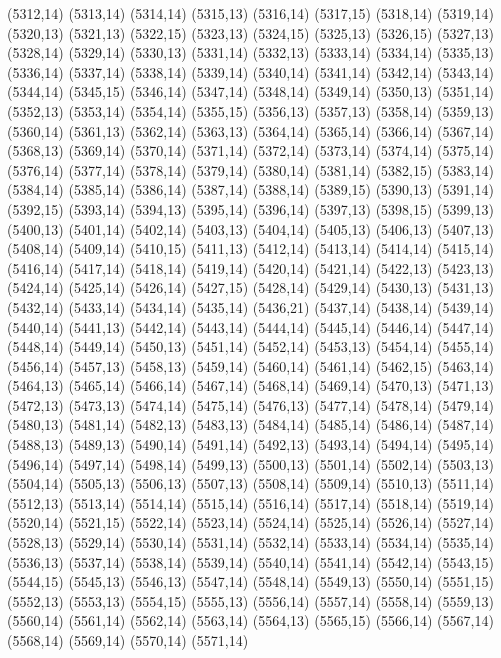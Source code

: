 (5312,14)
(5313,14)
(5314,14)
(5315,13)
(5316,14)
(5317,15)
(5318,14)
(5319,14)
(5320,13)
(5321,13)
(5322,15)
(5323,13)
(5324,15)
(5325,13)
(5326,15)
(5327,13)
(5328,14)
(5329,14)
(5330,13)
(5331,14)
(5332,13)
(5333,14)
(5334,14)
(5335,13)
(5336,14)
(5337,14)
(5338,14)
(5339,14)
(5340,14)
(5341,14)
(5342,14)
(5343,14)
(5344,14)
(5345,15)
(5346,14)
(5347,14)
(5348,14)
(5349,14)
(5350,13)
(5351,14)
(5352,13)
(5353,14)
(5354,14)
(5355,15)
(5356,13)
(5357,13)
(5358,14)
(5359,13)
(5360,14)
(5361,13)
(5362,14)
(5363,13)
(5364,14)
(5365,14)
(5366,14)
(5367,14)
(5368,13)
(5369,14)
(5370,14)
(5371,14)
(5372,14)
(5373,14)
(5374,14)
(5375,14)
(5376,14)
(5377,14)
(5378,14)
(5379,14)
(5380,14)
(5381,14)
(5382,15)
(5383,14)
(5384,14)
(5385,14)
(5386,14)
(5387,14)
(5388,14)
(5389,15)
(5390,13)
(5391,14)
(5392,15)
(5393,14)
(5394,13)
(5395,14)
(5396,14)
(5397,13)
(5398,15)
(5399,13)
(5400,13)
(5401,14)
(5402,14)
(5403,13)
(5404,14)
(5405,13)
(5406,13)
(5407,13)
(5408,14)
(5409,14)
(5410,15)
(5411,13)
(5412,14)
(5413,14)
(5414,14)
(5415,14)
(5416,14)
(5417,14)
(5418,14)
(5419,14)
(5420,14)
(5421,14)
(5422,13)
(5423,13)
(5424,14)
(5425,14)
(5426,14)
(5427,15)
(5428,14)
(5429,14)
(5430,13)
(5431,13)
(5432,14)
(5433,14)
(5434,14)
(5435,14)
(5436,21)
(5437,14)
(5438,14)
(5439,14)
(5440,14)
(5441,13)
(5442,14)
(5443,14)
(5444,14)
(5445,14)
(5446,14)
(5447,14)
(5448,14)
(5449,14)
(5450,13)
(5451,14)
(5452,14)
(5453,13)
(5454,14)
(5455,14)
(5456,14)
(5457,13)
(5458,13)
(5459,14)
(5460,14)
(5461,14)
(5462,15)
(5463,14)
(5464,13)
(5465,14)
(5466,14)
(5467,14)
(5468,14)
(5469,14)
(5470,13)
(5471,13)
(5472,13)
(5473,13)
(5474,14)
(5475,14)
(5476,13)
(5477,14)
(5478,14)
(5479,14)
(5480,13)
(5481,14)
(5482,13)
(5483,13)
(5484,14)
(5485,14)
(5486,14)
(5487,14)
(5488,13)
(5489,13)
(5490,14)
(5491,14)
(5492,13)
(5493,14)
(5494,14)
(5495,14)
(5496,14)
(5497,14)
(5498,14)
(5499,13)
(5500,13)
(5501,14)
(5502,14)
(5503,13)
(5504,14)
(5505,13)
(5506,13)
(5507,13)
(5508,14)
(5509,14)
(5510,13)
(5511,14)
(5512,13)
(5513,14)
(5514,14)
(5515,14)
(5516,14)
(5517,14)
(5518,14)
(5519,14)
(5520,14)
(5521,15)
(5522,14)
(5523,14)
(5524,14)
(5525,14)
(5526,14)
(5527,14)
(5528,13)
(5529,14)
(5530,14)
(5531,14)
(5532,14)
(5533,14)
(5534,14)
(5535,14)
(5536,13)
(5537,14)
(5538,14)
(5539,14)
(5540,14)
(5541,14)
(5542,14)
(5543,15)
(5544,15)
(5545,13)
(5546,13)
(5547,14)
(5548,14)
(5549,13)
(5550,14)
(5551,15)
(5552,13)
(5553,13)
(5554,15)
(5555,13)
(5556,14)
(5557,14)
(5558,14)
(5559,13)
(5560,14)
(5561,14)
(5562,14)
(5563,14)
(5564,13)
(5565,15)
(5566,14)
(5567,14)
(5568,14)
(5569,14)
(5570,14)
(5571,14)
